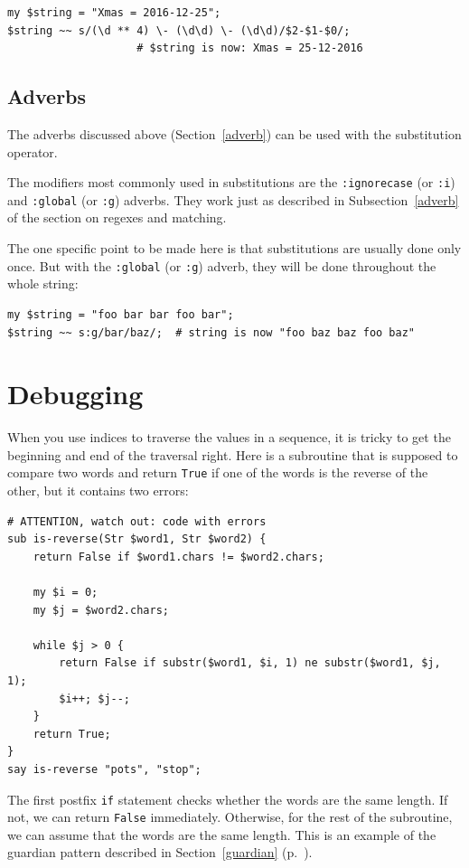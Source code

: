 \begin{verbatim}
my $string = "Xmas = 2016-12-25";
$string ~~ s/(\d ** 4) \- (\d\d) \- (\d\d)/$2-$1-$0/;
                    # $string is now: Xmas = 25-12-2016
\end{verbatim}
%

\subsection{Adverbs}
\label{regex_adverbs}

The adverbs discussed above (Section~\ref{adverb}) can be 
used with the substitution operator. 

The modifiers most commonly used in substitutions are the 
{\tt :ignorecase} (or {\tt :i}) and {\tt :global} (or 
{\tt :g}) adverbs. They work just as described in 
Subsection~\ref{adverb} of the section on regexes 
and matching. 

The one specific point to be made here is that substitutions 
are usually done only once. But with the {\tt :global} (or 
{\tt :g}) adverb, they will be done throughout the whole 
string:

\begin{verbatim}
my $string = "foo bar bar foo bar";
$string ~~ s:g/bar/baz/;  # string is now "foo baz baz foo baz"                    
\end{verbatim}
%


\section{Debugging}

When you use indices to traverse the values in a sequence,
it is tricky to get the beginning and end of the traversal
right.  Here is a subroutine that is supposed to compare two
words and return {\tt True} if one of the words is the reverse
of the other, but it contains two errors:

\begin{verbatim}
# ATTENTION, watch out: code with errors
sub is-reverse(Str $word1, Str $word2) {
    return False if $word1.chars != $word2.chars;
    
    my $i = 0;
    my $j = $word2.chars;

    while $j > 0 {
        return False if substr($word1, $i, 1) ne substr($word1, $j, 1);
        $i++; $j--;
    }
    return True;
}
say is-reverse "pots", "stop";

\end{verbatim}
%
The first postfix {\tt if} statement checks whether the words 
are the same length.  If not, we can return {\tt False} 
immediately. Otherwise, for the rest of the subroutine, 
we can assume that the words are the same length.  
This is an example of the guardian pattern described 
in Section~\ref{guardian} (p.~\pageref{guardian}).

